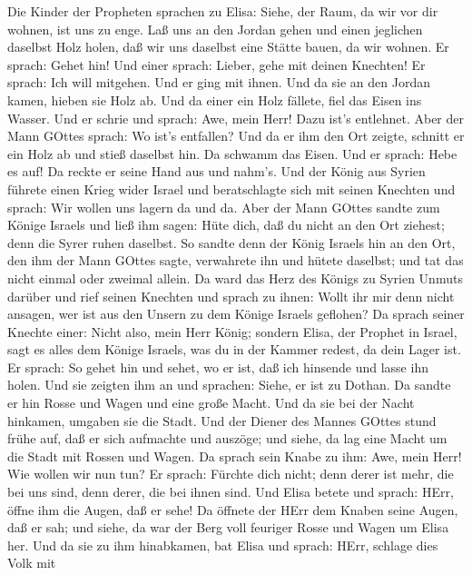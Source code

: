  Die Kinder der Propheten sprachen zu Elisa: Siehe, der
Raum, da wir vor dir wohnen, ist uns zu enge.  Laß uns an
den Jordan gehen und einen jeglichen daselbst Holz holen, daß wir uns
daselbst eine Stätte bauen, da wir wohnen. Er sprach: Gehet hin!
 Und einer sprach: Lieber, gehe mit deinen Knechten! Er
sprach: Ich will mitgehen.  Und er ging mit ihnen. Und da
sie an den Jordan kamen, hieben sie Holz ab.  Und da einer
ein Holz fällete, fiel das Eisen ins Wasser. Und er schrie und sprach:
Awe, mein Herr! Dazu ist's entlehnet.  Aber der Mann GOttes
sprach: Wo ist's entfallen? Und da er ihm den Ort zeigte, schnitt er ein
Holz ab und stieß daselbst hin. Da schwamm das Eisen.  Und
er sprach: Hebe es auf! Da reckte er seine Hand aus und nahm's.
 Und der König aus Syrien führete einen Krieg wider Israel
und beratschlagte sich mit seinen Knechten und sprach: Wir wollen uns
lagern da und da.  Aber der Mann GOttes sandte zum Könige
Israels und ließ ihm sagen: Hüte dich, daß du nicht an den Ort ziehest;
denn die Syrer ruhen daselbst.  So sandte denn der König
Israels hin an den Ort, den ihm der Mann GOttes sagte, verwahrete ihn
und hütete daselbst; und tat das nicht einmal oder zweimal allein.
 Da ward das Herz des Königs zu Syrien Unmuts darüber und
rief seinen Knechten und sprach zu ihnen: Wollt ihr mir denn nicht
ansagen, wer ist aus den Unsern zu dem Könige Israels geflohen?
 Da sprach seiner Knechte einer: Nicht also, mein Herr
König; sondern Elisa, der Prophet in Israel, sagt es alles dem Könige
Israels, was du in der Kammer redest, da dein Lager ist. 
Er sprach: So gehet hin und sehet, wo er ist, daß ich hinsende und lasse
ihn holen. Und sie zeigten ihm an und sprachen: Siehe, er ist zu Dothan.
 Da sandte er hin Rosse und Wagen und eine große Macht. Und
da sie bei der Nacht hinkamen, umgaben sie die Stadt.  Und
der Diener des Mannes GOttes stund frühe auf, daß er sich aufmachte und
auszöge; und siehe, da lag eine Macht um die Stadt mit Rossen und Wagen.
Da sprach sein Knabe zu ihm: Awe, mein Herr! Wie wollen wir nun tun?
 Er sprach: Fürchte dich nicht; denn derer ist mehr, die
bei uns sind, denn derer, die bei ihnen sind.  Und Elisa
betete und sprach: HErr, öffne ihm die Augen, daß er sehe! Da öffnete
der HErr dem Knaben seine Augen, daß er sah; und siehe, da war der Berg
voll feuriger Rosse und Wagen um Elisa her.  Und da sie zu
ihm hinabkamen, bat Elisa und sprach: HErr, schlage dies Volk mit
